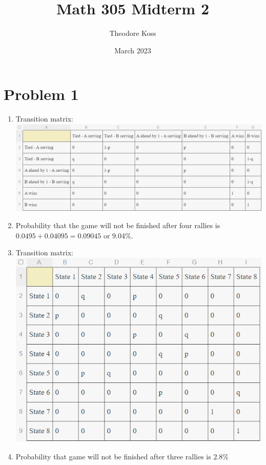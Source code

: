 \documentclass{article}
\title{Math 305 Midterm 2}
\author{Theodore Koss}
\date{March 2023}
\begin{document}
\maketitle

\section*{Problem 1}
\begin{enumerate}[label=(\alph*)]
    \item Transition matrix: \newline\includegraphics[scale=.35]{Pictures/Matrix1.png}
    \item Probability that the game will not be finished after four rallies is $0.0495+ 0.04095 = 0.09045$ or 9.04\%.
    \item Transition matrix:\newline\includegraphics[scale=.375]{Pictures/Matrix2.png}
    \item Probability that game will not be finished after three rallies is $2.8\%$
\end{enumerate}
\end{document}
